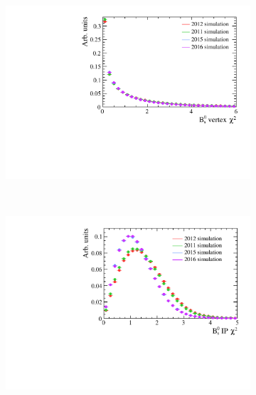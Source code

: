 \begin{figure}
 \begin{subfigure}[b]{0.48\textwidth}
        \includegraphics[width=\textwidth]{./Figs/Selection/signal_end_vertex.pdf}
        \caption{ }
        \label{fig:BDTsig}
    \end{subfigure}
    ~ %
    \begin{subfigure}[b]{0.48\textwidth}
       \includegraphics[width=\textwidth]{./Figs/Selection/signal_IPS.pdf}
        \caption{ }
        \label{fig:BDTbkg}
    \end{subfigure}






\end{figure}
